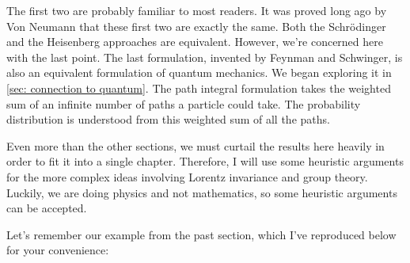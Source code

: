 The first two are probably familiar to most readers. It was proved long ago by Von Neumann that these first two are exactly the same. Both the Schr\"odinger and the Heisenberg approaches are equivalent. However, we're concerned here with the last point. The last formulation, invented by Feynman and Schwinger, is also an equivalent formulation of quantum mechanics. We began exploring it in \autoref{sec: connection to quantum}. The path integral formulation takes the weighted sum of an infinite number of paths a particle could take. The probability distribution is understood from this weighted sum of all the paths.

Even more than the other sections, we must curtail the results here heavily in order to fit it into a single chapter. Therefore, I will use some heuristic arguments for the more complex ideas involving Lorentz invariance and group theory. Luckily, we are doing physics and not mathematics, so some heuristic arguments can be accepted. 

Let's remember our example from the past section, which I've reproduced below for your convenience:

